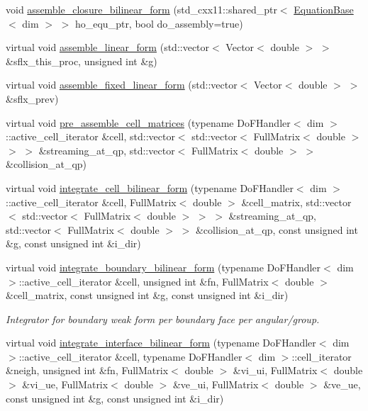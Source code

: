 \begin{DoxyCompactItemize}
void \hyperlink{class_equation_base_a44faf34fc306d85f5e84e9c16bea985d}{assemble\+\_\+closure\+\_\+bilinear\+\_\+form} (std\+\_\+cxx11\+::shared\+\_\+ptr$<$ \hyperlink{class_equation_base}{Equation\+Base}$<$ dim $>$ $>$ ho\+\_\+equ\+\_\+ptr, bool do\+\_\+assembly=true)
\item 
virtual void \hyperlink{class_equation_base_ac08c0b8c03ccd29f0b9eb49f6e63f8e9}{assemble\+\_\+linear\+\_\+form} (std\+::vector$<$ Vector$<$ double $>$ $>$ \&sflx\+\_\+this\+\_\+proc, unsigned int \&g)
\item 
virtual void \hyperlink{class_equation_base_aa6a5d3dd752c1e2389b329c141c44ee7}{assemble\+\_\+fixed\+\_\+linear\+\_\+form} (std\+::vector$<$ Vector$<$ double $>$ $>$ \&sflx\+\_\+prev)
\item 
virtual void \hyperlink{class_equation_base_a39f0465a523e038302f624f89c08a2ee}{pre\+\_\+assemble\+\_\+cell\+\_\+matrices} (typename Do\+F\+Handler$<$ dim $>$\+::active\+\_\+cell\+\_\+iterator \&cell, std\+::vector$<$ std\+::vector$<$ Full\+Matrix$<$ double $>$ $>$ $>$ \&streaming\+\_\+at\+\_\+qp, std\+::vector$<$ Full\+Matrix$<$ double $>$ $>$ \&collision\+\_\+at\+\_\+qp)
\item 
virtual void \hyperlink{class_equation_base_a7421b3c18433975ac794ac22c3af715a}{integrate\+\_\+cell\+\_\+bilinear\+\_\+form} (typename Do\+F\+Handler$<$ dim $>$\+::active\+\_\+cell\+\_\+iterator \&cell, Full\+Matrix$<$ double $>$ \&cell\+\_\+matrix, std\+::vector$<$ std\+::vector$<$ Full\+Matrix$<$ double $>$ $>$ $>$ \&streaming\+\_\+at\+\_\+qp, std\+::vector$<$ Full\+Matrix$<$ double $>$ $>$ \&collision\+\_\+at\+\_\+qp, const unsigned int \&g, const unsigned int \&i\+\_\+dir)
\item 
virtual void \hyperlink{class_equation_base_ae294806284f671619cac9e7169ffff8d}{integrate\+\_\+boundary\+\_\+bilinear\+\_\+form} (typename Do\+F\+Handler$<$ dim $>$\+::active\+\_\+cell\+\_\+iterator \&cell, unsigned int \&fn, Full\+Matrix$<$ double $>$ \&cell\+\_\+matrix, const unsigned int \&g, const unsigned int \&i\+\_\+dir)
\begin{DoxyCompactList}\small\item\em Integrator for boundary weak form per boundary face per angular/group. \end{DoxyCompactList}\item 
virtual void \hyperlink{class_equation_base_af56caa04c80d8f388e116307930d0063}{integrate\+\_\+interface\+\_\+bilinear\+\_\+form} (typename Do\+F\+Handler$<$ dim $>$\+::active\+\_\+cell\+\_\+iterator \&cell, typename Do\+F\+Handler$<$ dim $>$\+::cell\+\_\+iterator \&neigh, unsigned int \&fn, Full\+Matrix$<$ double $>$ \&vi\+\_\+ui, Full\+Matrix$<$ double $>$ \&vi\+\_\+ue, Full\+Matrix$<$ double $>$ \&ve\+\_\+ui, Full\+Matrix$<$ double $>$ \&ve\+\_\+ue, const unsigned int \&g, const unsigned int \&i\+\_\+dir)

\end{DoxyCompactItemize}
